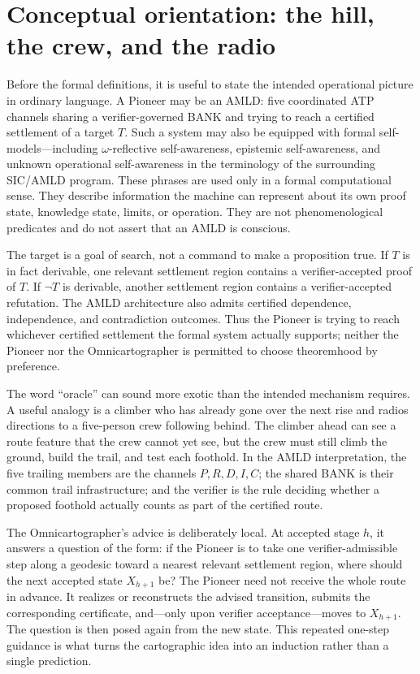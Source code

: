 \documentclass[11pt]{article}
\theoremstyle{remark}
\begin{document}
\section{Conceptual orientation: the hill, the crew, and the radio}

Before the formal definitions, it is useful to state the intended operational picture in ordinary language. A Pioneer may be an AMLD: five coordinated ATP channels sharing a verifier-governed BANK and trying to reach a certified settlement of a target $T$. Such a system may also be equipped with formal self-models---including $\omega$-reflective self-awareness, epistemic self-awareness, and unknown operational self-awareness in the terminology of the surrounding SIC/AMLD program. These phrases are used only in a formal computational sense. They describe information the machine can represent about its own proof state, knowledge state, limits, or operation. They are not phenomenological predicates and do not assert that an AMLD is conscious.

The target is a goal of search, not a command to make a proposition true. If $T$ is in fact derivable, one relevant settlement region contains a verifier-accepted proof of $T$. If $\neg T$ is derivable, another settlement region contains a verifier-accepted refutation. The AMLD architecture also admits certified dependence, independence, and contradiction outcomes. Thus the Pioneer is trying to reach whichever certified settlement the formal system actually supports; neither the Pioneer nor the Omnicartographer is permitted to choose theoremhood by preference.

The word ``oracle'' can sound more exotic than the intended mechanism requires. A useful analogy is a climber who has already gone over the next rise and radios directions to a five-person crew following behind. The climber ahead can see a route feature that the crew cannot yet see, but the crew must still climb the ground, build the trail, and test each foothold. In the AMLD interpretation, the five trailing members are the channels $P,R,D,I,C$; the shared BANK is their common trail infrastructure; and the verifier is the rule deciding whether a proposed foothold actually counts as part of the certified route.

The Omnicartographer's advice is deliberately local. At accepted stage $h$, it answers a question of the form: if the Pioneer is to take one verifier-admissible step along a geodesic toward a nearest relevant settlement region, where should the next accepted state $X_{h+1}$ be? The Pioneer need not receive the whole route in advance. It realizes or reconstructs the advised transition, submits the corresponding certificate, and---only upon verifier acceptance---moves to $X_{h+1}$. The question is then posed again from the new state. This repeated one-step guidance is what turns the cartographic idea into an induction rather than a single prediction.
\end{document}
